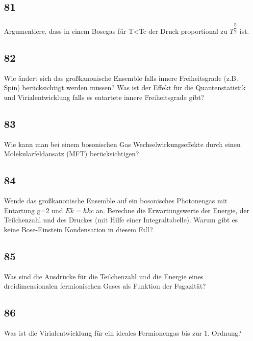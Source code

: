 \documentclass[12pt,a4paper]{report}
\newenvironment{myfrag}{\begin{it}}{\end{it}\vspace{3mm}\par}
\numberwithin{equation}{section}
\begin{document}
\subsection{81}
\begin{myfrag}
Argumentiere, dass in einem Bosegas für T<Tc der Druck proportional zu $T^{\dfrac{5}{2}}$
ist.
\end{myfrag}
\subsection{82}
\begin{myfrag}
Wie ändert sich das großkanonische Ensemble falls innere Freiheitsgrade
(z.B. Spin) berücksichtigt werden müssen? Was ist der Effekt für die
Quantenstatistik und Virialentwicklung falls es entartete innere Freiheitsgrade
gibt?
\end{myfrag}
\subsection{83}
\begin{myfrag}
Wie kann man bei einem bosonischen Gas Wechselwirkungseffekte durch
einen Molekularfeldansatz (MFT) berücksichtigen?
\end{myfrag}
\subsection{84}
\begin{myfrag}
Wende das großkanonische Ensemble auf ein bosonisches Photonengas mit
Entartung g=2 und $Ek=\hbar kc$ an. Berechne die Erwartungswerte der Energie,
der Teilchenzahl und des Druckes (mit Hilfe einer Integraltabelle). Warum
gibt es keine Bose-Einstein Kondensation in diesem Fall?
\end{myfrag}
\subsection{85}
\begin{myfrag}
Was sind die Ausdrücke für die Teilchenzahl und die Energie eines
dreidimensionalen fermionischen Gases als Funktion der Fugazität?
\end{myfrag}
\subsection{86}
\begin{myfrag}
Was ist die Virialentwicklung für ein ideales Fermionengas bis zur 1.
Ordnung?
\end{myfrag}
\end{document}
